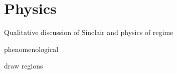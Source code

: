 \section{Physics}

Qualitative discussion of Sinclair and physics of regime

phenomenological 

draw regions
